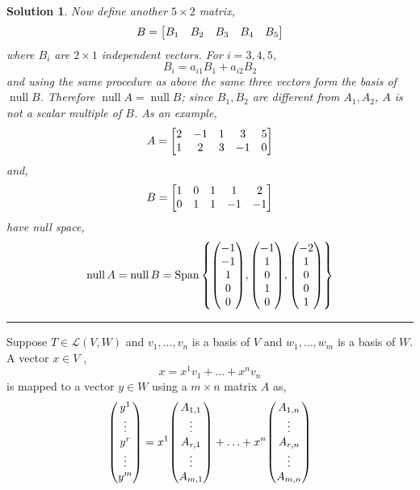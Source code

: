 \documentclass[11pt,a4paper]{scrartcl}
\DeclareMathOperator{\nspace}{null}
\DeclareMathOperator{\Span}{Span}
\newcommand{\lmap}[2]{\mathcal{L}(#1,#2)}
\theoremstyle{solve}
\newtheorem*{solution}{Solution}
\begin{document}
\begin{solution}
    \noindent Now define another $5 \times 2$ matrix,
    \[
    B = \mqty[ B_1 & B_2 & B_3 & B_4 & B_5 ]
    \]  
    where $B_i$ are $2 \times 1$ independent vectors. For $i=3,4,5$,
    \[
    B_i = a_{i1} B_1 + a_{i2} B_2 
    \]  
    and using the same procedure as above the same three vectors
    form the basis of $\nspace B$. Therefore $\nspace A = \nspace B$;
    since $B_1,B_2$ are different from $A_1,A_2$, $A$ is not a scalar multiple of $B$. As an example,
    \[
    A =
    \mqty[
    2 &  -1 &  1  &  3   &  5 \\
    1 &  2  &  3  &  -1  &  0
    ]
    \]
    and,
    \[
    B =
    \mqty[
    1 &  0 &  1  &  1   &  2 \\
    0 &  1 &  1  &  -1  &  -1
    ]    
    \]
    have null space,
    \[
    \nspace A = \nspace B = 
    \Span 
    \left\{
    \mqty(
    -1 \\
    -1 \\
    1 \\
    0 \\
    0
    ),
    \mqty(
    -1 \\
    1 \\
    0 \\
    1 \\
    0
    ),
    \mqty(
    -2 \\
    1 \\
    0 \\
    0 \\
    1
    )    
    \right\}
    \]
\end{solution}
\vspace{1cm}
\noindent\rule{\textwidth}{0.5pt}
\par\noindent Suppose $T \in \lmap{V}{W}$ and $v_1,\ldots,v_n$
is a basis of $V$ and $w_1,\ldots,w_m$ is a  basis of $W$.
A vector $x \in V$ ,
\[
x=x^1 v_1 + \ldots + x^n v_n 
\]
is mapped to a vector $y \in W$ using a $m \times n$ matrix $A$ as,
\[
\mqty(
y^1 \\
\vdots \\
y^r \\
\vdots \\
y^m
)
=
x^1 
\mqty(
A_{1,1} \\
\vdots \\
A_{r,1} \\
\vdots \\
A_{m,1}
)
+ \ldots +
x^n 
\mqty(
A_{1,n} \\
\vdots \\
A_{r,n} \\
\vdots \\
A_{m,n}
)
\]
\end{document}
